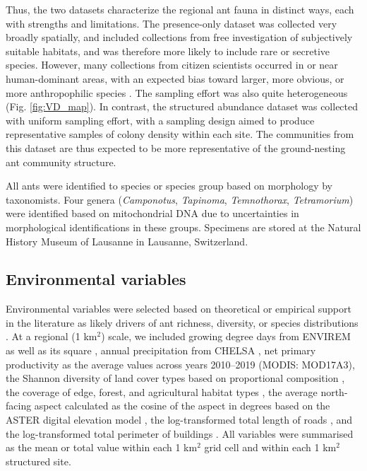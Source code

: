 \documentclass[preprint,final,times,12pt,3p]{elsarticle}
\begin{document}
Thus, the two datasets characterize the regional ant fauna in distinct ways, each with strengths and limitations. The presence-only dataset was collected very broadly spatially, and included collections from free investigation of subjectively suitable habitats, and was therefore more likely to include rare or secretive species. However, many collections from citizen scientists occurred in or near human-dominant areas, with an expected bias toward larger, more obvious, or more anthropophilic species \citep{Ward2014, Troudet2017}. The sampling effort was also quite heterogeneous (Fig. \ref{fig:VD_map}). In contrast, the structured abundance dataset was collected with uniform sampling effort, with a sampling design aimed to produce representative samples of colony density within each site. The communities from this dataset are thus expected to be more representative of the ground-nesting ant community structure. 

All ants were identified to species or species group based on morphology by taxonomists. Four genera (\emph{Camponotus}, \emph{Tapinoma}, \emph{Temnothorax}, \emph{Tetramorium}) were identified based on mitochondrial DNA due to uncertainties in morphological identifications in these groups. Specimens are stored at the Natural History Museum of Lausanne in Lausanne, Switzerland. 


\subsection{Environmental variables}
Environmental variables were selected based on theoretical or empirical support in the literature as likely drivers of ant richness, diversity, or species distributions \citep{Bishop2017,Liu2018,Szewczyk2018,Longino2019,Uhey2020}. At a regional (1 km$^2$) scale, we included growing degree days from ENVIREM as well as its square \citep{Title2018}, annual precipitation from CHELSA \citep{Karger2017}, net primary productivity as the average values across years 2010–2019 (MODIS: MOD17A3), the Shannon diversity of land cover types based on proportional composition \citep{Gago-Silva2017}, the coverage of edge, forest, and agricultural habitat types \citep{Gago-Silva2017}, the average north-facing aspect calculated as the cosine of the aspect in degrees based on the ASTER digital elevation model \citep{Tachikawa2011}, the log-transformed total length of roads \citep{OpenStreetMap}, and the log-transformed total perimeter of buildings \citep{OpenStreetMap}. All variables were summarised as the mean or total value within each 1 km$^2$ grid cell and within each 1 km$^2$ structured site.
\end{document}
